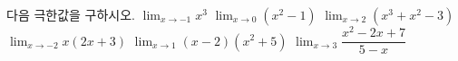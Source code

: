 다음 극한값을 구하시오.
 $\displaystyle\lim_{x\to -1} x^3$
 $\displaystyle\lim_{x\to 0}(x^2-1)$
 $\displaystyle\lim_{x\to 2}(x^3+x^2-3)$
 $\displaystyle\lim_{x\to -2} x(2x+3)$
 $\displaystyle\lim_{x\to 1}(x-2)(x^2+5)$
 $\displaystyle\lim_{x\to 3}\dfrac{x^2-2x+7}{5-x}$
